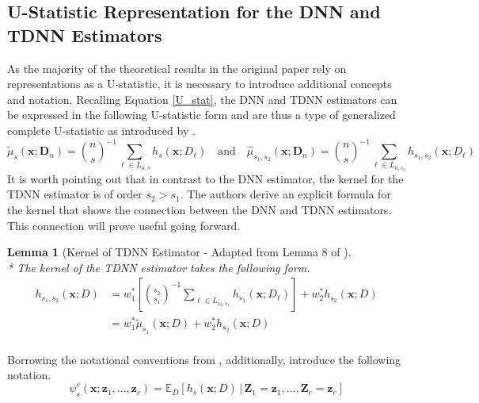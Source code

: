 \documentclass[letterpaper,10pt]{article}
\numberwithin{equation}{section}
\numberwithin{thm}{section}
\newtheorem{lem}{Lemma}
\numberwithin{lem}{section}
\numberwithin{cor}{section}
\renewcommand{\hat}{\widehat}
\newcommand{\E}{\mathbb{E}}
\newcommand{\1}{\mathbbm{1}}
\begin{document}
\subsection{U-Statistic Representation for the DNN and TDNN Estimators}
As the majority of the theoretical results in the original paper rely on representations as a U-statistic, it is necessary to introduce additional concepts and notation.
Recalling Equation \ref{U_stat}, the DNN and TDNN estimators can be expressed in the following U-statistic form and are thus a type of generalized complete U-statistic as introduced by \citet{peng_rates_2022}.
\begin{equation}
	\tilde{\mu}_{s}(\mathbf{x}; \mathbf{D}_n)
	= \binom{n}{s}^{-1} \sum_{\ell \in L_{n,s}} h_{s}(\mathbf{x}; D_{\ell})
	\quad \text{and} \quad
	\hat{\mu}_{s_1, s_2}(\mathbf{x}; \mathbf{D}_n)
	= \binom{n}{s}^{-1} \sum_{\ell \in L_{n,s_2}} h_{s_1, s_2}(\mathbf{x}; D_{\ell})
\end{equation}
It is worth pointing out that in contrast to the DNN estimator, the kernel for the TDNN estimator is of order $s_2 > s_1$.
The authors derive an explicit formula for the kernel that shows the connection between the DNN and TDNN estimators.
This connection will prove useful going forward.
\begin{lem}[Kernel of TDNN Estimator - Adapted from Lemma 8 of \citet{demirkaya_optimal_2024}]\label{lem:dem8}\mbox{}\\*
	The kernel of the TDNN estimator takes the following form.
	\begin{equation}
		\begin{aligned}
			h_{s_1, s_2}\left(\mathbf{x}; D\right)
			 & = w_{1}^{*}\left[\binom{s_2}{s_1}^{-1}\sum_{\ell \in L_{s_2, s_1}} h_{s_1}\left(\mathbf{x}; D_{\ell}\right)\right] + w_{2}^{*} h_{s_2}\left(\mathbf{x}; D\right) \\
			 & = w_{1}^{*} \tilde{\mu}_{s_1}\left(\mathbf{x}; D\right) + w_{2}^{*} h_{s_2}\left(\mathbf{x}; D\right)                                                            \\
		\end{aligned}
	\end{equation}
\end{lem}
Borrowing the notational conventions from \citet{lee_u-statistics_2019}, additionally, introduce the following notation.
\begin{equation}\label{eq:psi_s_c}
	\psi_{s}^{c}(\mathbf{x}; \mathbf{z}_{1}, \dotsc, \mathbf{z}_{c})
	= \E_{D}\left[h_{s}\left(\mathbf{x}; D\right) \, | \,  \mathbf{Z}_1 = \mathbf{z}_{1}, \dotsc, \mathbf{Z}_c = \mathbf{z}_{c}\right]
\end{equation}
\end{document}
